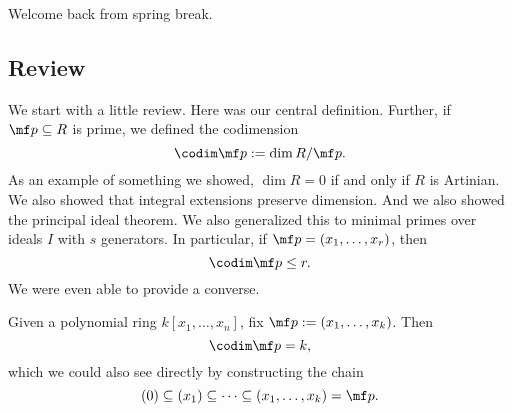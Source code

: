 
Welcome back from spring break.

\subsection{Review}
We start with a little review. Here was our central definition.
\krulldimdef*
\noindent Further, if $\mf p\subseteq R$ is prime, we defined the codimension
\[\codim\mf p:=\dim R/\mf p.\]
As an example of something we showed, $\dim R=0$ if and only if $R$ is Artinian. We also showed that integral extensions preserve dimension.
\intextensiondimension*
\noindent And we also showed the principal ideal theorem.
\pidtheorem*
\noindent We also generalized this to minimal primes over ideals $I$ with $s$ generators. In particular, if $\mf p=(x_1,\ldots,x_r)$, then
\[\codim\mf p\le r.\]
We were even able to provide a converse.
\pidthmconverse*
\begin{example}
	Given a polynomial ring $k[x_1,\ldots,x_n]$, fix $\mf p:=(x_1,\ldots,x_k)$. Then
	\[\codim\mf p=k,\]
	which we could also see directly by constructing the chain
	\[(0)\subseteq(x_1)\subseteq\cdots\subseteq(x_1,\ldots,x_k)=\mf p.\]
\end{example}


